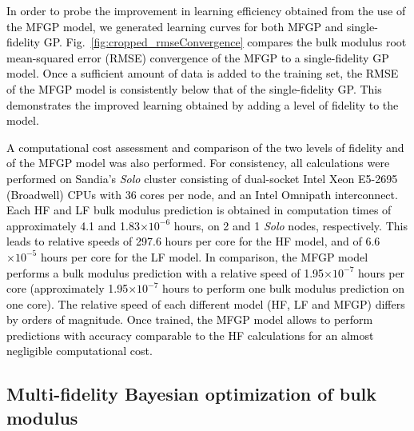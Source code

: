 \documentclass[%
 reprint,
aip,jcp
]{revtex4-1}
\newcommand{\review}[1]{\textcolor{black}{#1}}
\begin{document}
\review{In order to probe the improvement in learning efficiency 
obtained from the use of the MFGP model, 
we generated learning curves 
for both MFGP and single-fidelity GP. 
Fig.~\ref{fig:cropped_rmseConvergence} compares the bulk modulus 
root mean-squared error (RMSE) convergence of the MFGP to a 
single-fidelity GP model.
Once a sufficient amount of data is added to the training set, the RMSE 
of the MFGP model is consistently below that of the single-fidelity GP.
This demonstrates the improved learning obtained by adding a level 
of fidelity to the model.
}

\review{
A computational cost assessment and comparison of the 
two levels of fidelity and of the MFGP model was also performed. 
For consistency, all calculations were performed on Sandia's
\emph{Solo} cluster consisting of
dual-socket Intel Xeon E5-2695 (Broadwell) CPUs with 36 cores per 
node, and an Intel Omnipath interconnect.
Each HF and LF bulk modulus prediction is obtained in computation times of
approximately 4.1 and 1.83$\times 10^{-6}$ hours, on 2 and 1 \emph{Solo}
nodes, respectively.
This leads to relative speeds of 297.6 hours per core for the HF model, 
and of 6.6 $\times 10^{-5}$ hours per core for the LF model.
In comparison, the MFGP model performs a bulk modulus prediction with 
a relative speed of 1.95$\times 10^{-7}$ hours per core (approximately
1.95$\times 10^{-7}$ hours to perform one bulk modulus prediction on one 
core).
The relative speed of each different model (HF, LF and MFGP) differs 
by orders of magnitude. Once trained, the MFGP model allows to perform 
predictions with accuracy comparable to the HF calculations for an 
almost negligible computational cost. 
}

\subsection{Multi-fidelity Bayesian optimization of bulk modulus}
\end{document}
